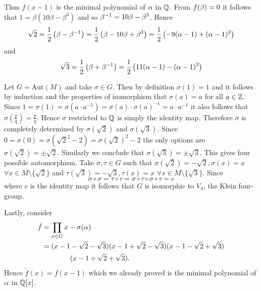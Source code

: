 \begin{sol}
        Thus $f(x-1)$ is the minimal polynomial of $\alpha$ in $\mathbb{Q}$. 
        From $f(\beta)=0$ it follows that $1=\beta(10\beta-\beta^3)$ and so $\beta^{-1}=10\beta-\beta^3$.
        Hence
        $$\sqrt{2}=\frac12\left(\beta-\beta^{-1}\right)=\frac12\left(\beta-10\beta+\beta^3\right)=\frac12\left(-9(\alpha-1)+(\alpha-1)^3\right)$$
        and
        $$\sqrt{3}=\frac12\left(\beta+\beta^{-1}\right)=\frac12\left(11(\alpha-1)-(\alpha-1)^3\right)$$

        Let $G=\text{Aut}(M)$ and take $\sigma\in G$. Then by definition $\sigma(1)=1$ and it follows by induction and the properties of isomorphism that $\sigma(a)=a$ for all $a\in\mathbb{Z}$.
        Since $1=\sigma(1)=\sigma(a\cdot a^{-1})=\sigma(a)\cdot\sigma(a)^{-1}=a\cdot a^{-1}$ it also follows that $\sigma\left(\frac{p}{q}\right)=\frac{p}{q}$. 
        Hence $\sigma$ restricted to $\mathbb{Q}$ is simply the identity map. 
        Therefore $\sigma$ is completely determined by $\sigma(\sqrt{2})$ and $\sigma(\sqrt{3})$.
        Since $0=\sigma(0)=\sigma(\sqrt{2}^2-2)=\sigma(\sqrt{2})^2-2$ the only options are $\sigma(\sqrt{2})=\pm\sqrt{2}$.
        Similarly we conclude that $\sigma(\sqrt{3})=\pm\sqrt{3}$. This gives four possible automorphism.
        Take $\sigma,\tau\in G$ such that $\sigma(\sqrt{2})=-\sqrt{2}, \sigma(x)=x$ $\forall x\in M\setminus\{\sqrt{2}\}$ and $\tau(\sqrt{3})=-\sqrt{3},\tau(x)=x$ $\forall x\in M\setminus\{\sqrt{3}\}$. 
        Since 
        $$\sigma\circ\sigma=\tau\circ\tau=\sigma\circ\tau\circ\sigma\circ\tau=e$$
        where $e$ is the identity map it follows that $G$ is isomorphic to $V_4$, the Klein four-group.

        Lastly, consider
        \begin{align*}
            \tilde{f}&=\prod_{\sigma\in G}x-\sigma(\alpha)\\
            &=(x-1-\sqrt{2}-\sqrt{3})(x-1+\sqrt{2}-\sqrt{3})(x-1-\sqrt{2}+\sqrt{3})\\&\qquad\qquad (x-1+\sqrt{2}+\sqrt{3}).
        \end{align*}
        Hence $\tilde{f}(x)=f(x-1)$ which we already proved is the minimal polynomial of $\alpha$ in $\mathbb{Q}[x]$.

    \end{sol}

